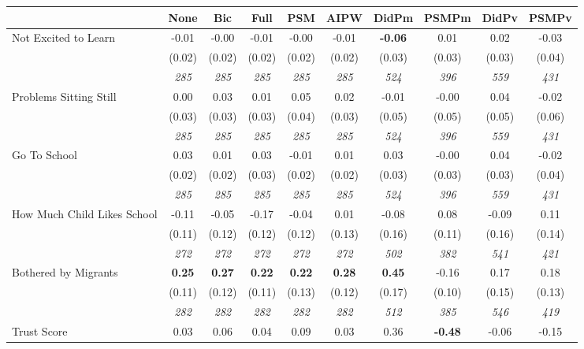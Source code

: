 \begin{tabular}{l c c c c c c c c c}
\toprule
 & None & Bic & Full & PSM & AIPW & DidPm & PSMPm & DidPv & PSMPv \\
\midrule
Not Excited to Learn & -0.01 & -0.00 & -0.01 & -0.00 & -0.01 & \textbf{ -0.06 } & 0.01 & 0.02 & -0.03 \\
& (0.02) & (0.02) & (0.02) & (0.02) & (0.02) & (0.03) & (0.03) & (0.03) & (0.04) \\
& \textit{ 285 } & \textit{ 285 } & \textit{ 285 } & \textit{ 285 } & \textit{ 285 } & \textit{ 524 } & \textit{ 396 } & \textit{ 559 } & \textit{ 431 } \\
Problems Sitting Still & 0.00 & 0.03 & 0.01 & 0.05 & 0.02 & -0.01 & -0.00 & 0.04 & -0.02 \\
& (0.03) & (0.03) & (0.03) & (0.04) & (0.03) & (0.05) & (0.05) & (0.05) & (0.06) \\
& \textit{ 285 } & \textit{ 285 } & \textit{ 285 } & \textit{ 285 } & \textit{ 285 } & \textit{ 524 } & \textit{ 396 } & \textit{ 559 } & \textit{ 431 } \\
Go To School & 0.03 & 0.01 & 0.03 & -0.01 & 0.01 & 0.03 & -0.00 & 0.04 & -0.02 \\
& (0.02) & (0.02) & (0.03) & (0.02) & (0.02) & (0.03) & (0.03) & (0.03) & (0.04) \\
& \textit{ 285 } & \textit{ 285 } & \textit{ 285 } & \textit{ 285 } & \textit{ 285 } & \textit{ 524 } & \textit{ 396 } & \textit{ 559 } & \textit{ 431 } \\
How Much Child Likes School & -0.11 & -0.05 & -0.17 & -0.04 & 0.01 & -0.08 & 0.08 & -0.09 & 0.11 \\
& (0.11) & (0.12) & (0.12) & (0.12) & (0.13) & (0.16) & (0.11) & (0.16) & (0.14) \\
& \textit{ 272 } & \textit{ 272 } & \textit{ 272 } & \textit{ 272 } & \textit{ 272 } & \textit{ 502 } & \textit{ 382 } & \textit{ 541 } & \textit{ 421 } \\
Bothered by Migrants & \textbf{ 0.25 } & \textbf{ 0.27 } & \textbf{ 0.22 } & \textbf{0.22} & \textbf{0.28} & \textbf{ 0.45 } & -0.16 & 0.17 & 0.18 \\
& (0.11) & (0.12) & (0.11) & (0.13) & (0.12) & (0.17) & (0.10) & (0.15) & (0.13) \\
& \textit{ 282 } & \textit{ 282 } & \textit{ 282 } & \textit{ 282 } & \textit{ 282 } & \textit{ 512 } & \textit{ 385 } & \textit{ 546 } & \textit{ 419 } \\
Trust Score & 0.03 & 0.06 & 0.04 & 0.09 & 0.03 & 0.36 & \textbf{-0.48} & -0.06 & -0.15 \\

\end{tabular}
